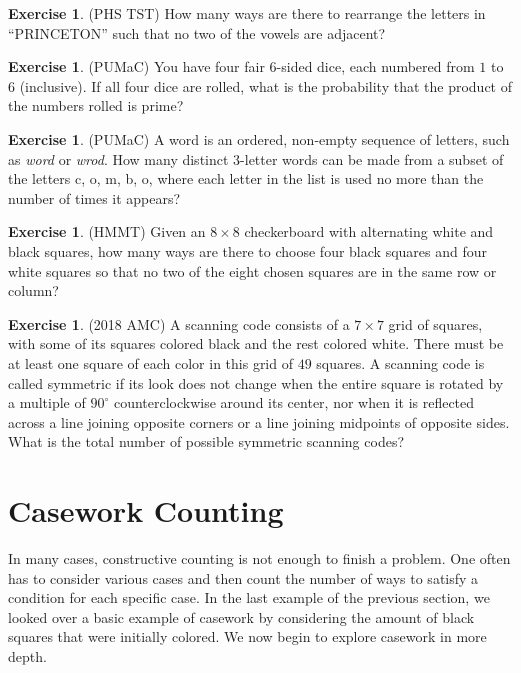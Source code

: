 \documentclass[letterpaper]{article}
\theoremstyle{remark}
\theoremstyle{definition}
\newtheorem{exercise}[thm]{Exercise}
\begin{document}
\begin{exercise}
(PHS TST) How many ways are there to rearrange the letters in “PRINCETON” such that no two of the vowels are
adjacent?
\end{exercise}

\begin{exercise}
(PUMaC) You have four fair $6$-sided dice, each numbered from $1$ to $6$ (inclusive). If all four dice are rolled, what is the probability that the product of the numbers rolled is prime?
\end{exercise}

\begin{exercise}
(PUMaC) A word is an ordered, non-empty sequence of letters, such as \textit{word} or \textit{wrod}. How many
distinct 3-letter words can be made from a subset of the letters c, o, m, b, o, where each letter
in the list is used no more than the number of times it appears?
\end{exercise}

\begin{exercise}
(HMMT) Given an $8\times 8$ checkerboard with alternating white and black squares, how many ways are there to choose four black squares and four white squares so that no two of the eight chosen squares are in the same row or column?
\end{exercise}

\begin{exercise}
(2018 AMC) A scanning code consists of a $7 \times 7$ grid of squares, with some of its squares colored black and the rest colored white. There must be at least one square of each color in this grid of $49$ squares. A scanning code is called symmetric if its look does not change when the entire square is rotated by a multiple of $90 ^{\circ}$ counterclockwise around its center, nor when it is reflected across a line joining opposite corners or a line joining midpoints of opposite sides. What is the total number of possible symmetric scanning codes?
\end{exercise}

\section{Casework Counting}
In many cases, constructive counting is not enough to finish a problem. One often has to consider various cases and then count the number of ways to satisfy a condition for each specific case. In the last example of the previous section, we looked over a basic example of casework by considering the amount of black squares that were initially colored. We now begin to explore casework in more depth.
\end{document}
